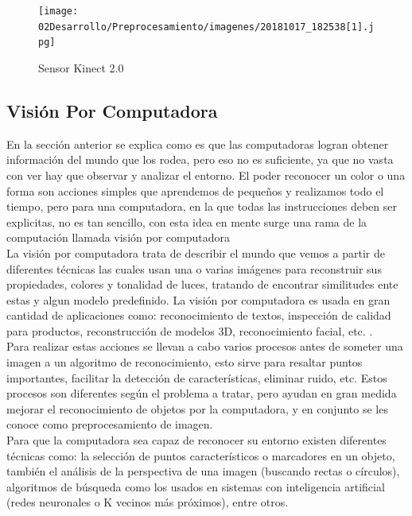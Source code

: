 \begin{figure}[!htb]
	\centering
	\texttt{[image: 02Desarrollo/Preprocesamiento/imagenes/20181017\_182538[1].jpg]}
	\caption{Sensor Kinect 2.0} 
	\label{fig:kinect}
\end{figure}



\subsection{Visión Por Computadora}
En la sección anterior se explica como es que las computadoras logran obtener información del mundo que los rodea, pero eso no es suficiente, ya que no vasta con ver hay que observar y analizar el entorno. El poder reconocer un color o una forma son acciones simples que aprendemos de pequeños y realizamos todo el tiempo, pero para una computadora, en la que todas las instrucciones deben ser explicitas, no es tan sencillo, con esta idea en mente surge una rama de la computación llamada visión por computadora\\

La visión por computadora trata de describir el mundo que vemos a partir de diferentes técnicas las cuales usan una o varias imágenes para reconstruir sus propiedades, colores y tonalidad de luces, tratando de encontrar similitudes ente estas y algun modelo predefinido. La visión por computadora es usada en gran cantidad de aplicaciones como: reconocimiento de textos, inspección de calidad para productos, reconstrucción de modelos 3D, reconocimiento facial, etc. \cite{CompVisionSpringer}.\\

Para realizar estas acciones se llevan a cabo varios procesos antes de someter una imagen a un algoritmo de reconocimiento, esto sirve para resaltar puntos importantes, facilitar la detección de características, eliminar ruido, etc. Estos procesos son diferentes según el problema a tratar, pero ayudan en gran medida mejorar el reconocimiento de objetos por la computadora, y en conjunto se les conoce como preprocesamiento de imagen.\\

Para que la computadora sea capaz de reconocer su entorno existen diferentes técnicas como: la selección de puntos característicos o marcadores en un objeto, %
 también el análisis de la perspectiva de una imagen (buscando rectas o círculos), algoritmos de búsqueda como los usados en sistemas con inteligencia artificial (redes neuronales o K vecinos más próximos), entre otros. \\

